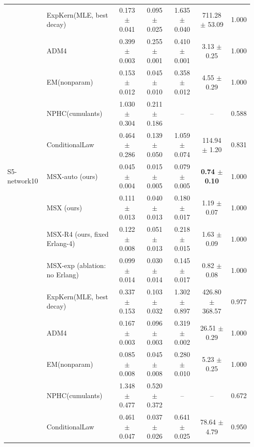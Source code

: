 \begin{tabular}{llccccc}
 & ExpKern(MLE, best decay) & 0.173 $\pm$ 0.041 & 0.095 $\pm$ 0.025 & 1.635 $\pm$ 0.040 & 711.28 $\pm$ 53.09 & 1.000 \\
 & ADM4 & 0.399 $\pm$ 0.003 & 0.255 $\pm$ 0.001 & 0.410 $\pm$ 0.001 & 3.13 $\pm$ 0.25 & 1.000 \\
 & EM(nonparam) & 0.153 $\pm$ 0.012 & 0.045 $\pm$ 0.010 & 0.358 $\pm$ 0.012 & 4.55 $\pm$ 0.29 & 1.000 \\
 & NPHC(cumulants) & 1.030 $\pm$ 0.304 & 0.211 $\pm$ 0.186 & -- & -- & 0.588 \\
 & ConditionalLaw & 0.464 $\pm$ 0.286 & 0.139 $\pm$ 0.050 & 1.059 $\pm$ 0.074 & 114.94 $\pm$ 1.20 & 0.831 \\
\midrule
S5-network10 & MSX-auto (ours) & 0.045 $\pm$ 0.004 & 0.015 $\pm$ 0.005 & 0.079 $\pm$ 0.005 & \textbf{0.74 $\pm$ 0.10} & 1.000 \\
 & MSX (ours) & 0.111 $\pm$ 0.013 & 0.040 $\pm$ 0.013 & 0.180 $\pm$ 0.017 & 1.19 $\pm$ 0.07 & 1.000 \\
 & MSX-R4 (ours, fixed Erlang-4) & 0.122 $\pm$ 0.008 & 0.051 $\pm$ 0.013 & 0.218 $\pm$ 0.015 & 1.63 $\pm$ 0.09 & 1.000 \\
 & MSX-exp (ablation: no Erlang) & 0.099 $\pm$ 0.014 & 0.030 $\pm$ 0.014 & 0.145 $\pm$ 0.017 & 0.82 $\pm$ 0.08 & 1.000 \\
 & ExpKern(MLE, best decay) & 0.337 $\pm$ 0.153 & 0.103 $\pm$ 0.032 & 1.302 $\pm$ 0.897 & 426.80 $\pm$ 368.57 & 0.977 \\
 & ADM4 & 0.167 $\pm$ 0.003 & 0.096 $\pm$ 0.003 & 0.319 $\pm$ 0.002 & 26.51 $\pm$ 0.29 & 1.000 \\
 & EM(nonparam) & 0.085 $\pm$ 0.008 & 0.045 $\pm$ 0.008 & 0.280 $\pm$ 0.010 & 5.23 $\pm$ 0.25 & 1.000 \\
 & NPHC(cumulants) & 1.348 $\pm$ 0.477 & 0.520 $\pm$ 0.372 & -- & -- & 0.672 \\
 & ConditionalLaw & 0.461 $\pm$ 0.047 & 0.037 $\pm$ 0.026 & 0.641 $\pm$ 0.025 & 78.64 $\pm$ 4.79 & 0.950 \\
\bottomrule
\end{tabular}